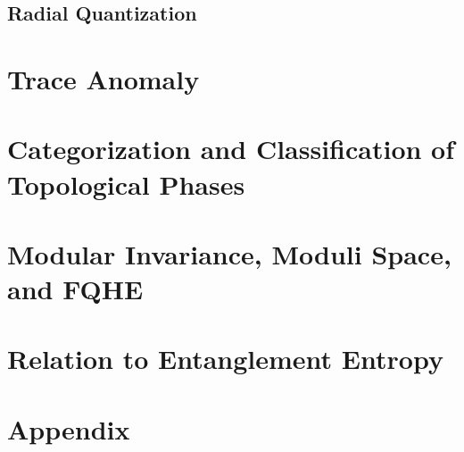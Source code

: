 \documentclass[10pt,nofootinbib]{revtex4}
\begin{document}
	\subsection{Radial Quantization}





\section{Trace Anomaly}

\section{Categorization and Classification of Topological Phases}

\section{Modular Invariance, Moduli Space, and FQHE}

\section{Relation to Entanglement Entropy}

\section{Appendix}
\end{document}
